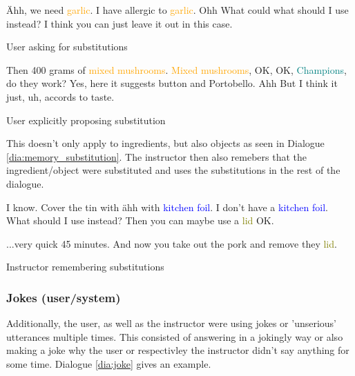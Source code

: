 \documentclass[
	11pt, %
]{fphw}
\newenvironment{captionedDialogue}
    {\captionsetup{
        type=Dialogue,
        skip=2pt,
        belowskip=15pt
        }
    }
    {}
\newenvironment{mydialogue}
    {\begin{snugshade}
     \hrulefill
     \begin{dialogue}}
    {\end{dialogue}
     \hrulefill
     \end{snugshade}}
\begin{document}
\begin{captionedDialogue}
    \begin{mydialogue}
         Ähh, we need \textcolor{orange}{garlic}. 
         I have allergic to \textcolor{orange}{garlic}.
         Ohh 
         What could what should I use instead? 
         I think you can just leave it out in this case.
    \end{mydialogue}
    \caption{User asking for substitutions}
    \label{dia:impl_substitution}
\end{captionedDialogue}

\begin{captionedDialogue}
    \begin{mydialogue}
         Then 400 grams of \textcolor{orange}{mixed mushrooms}. 
         \textcolor{orange}{Mixed mushrooms}, OK, OK, \textcolor{teal}{Champions}, do they work? 
         Yes, here it suggests button and Portobello. 
         Ahh 
         But I think it just, uh, accords to taste.
    \end{mydialogue}
    \caption{User explicitly proposing substitution}
    \label{dia:expl_substitution}
\end{captionedDialogue}

This doesn't only apply to ingredients, but also objects as seen in Dialogue \ref{dia:memory_substitution}. The instructor then also remebers that the ingredient/object were substituted and uses the substitutions in the rest of the dialogue.

\begin{captionedDialogue}
    \begin{mydialogue}
         I know. Cover the tin with ähh with \textcolor{blue}{kitchen foil}. 
         I don't have a \textcolor{blue}{kitchen foil}. What should I use instead? 
         Then you can maybe use a \textcolor{olive}{lid}
         OK.
        
        \medskip
        \direct{\dots}
        \medskip

         ...very quick 45 minutes. And now you take out the pork and remove they \textcolor{olive}{lid}. 
    \end{mydialogue}
    \caption{Instructor remembering substitutions}
    \label{dia:memory_substitution}
\end{captionedDialogue}

\subsubsection*{Jokes (user/system)}
Additionally, the user, as well as the instructor were using jokes or 'unserious' utterances multiple times. This consisted of answering in a jokingly way or also making a joke why the user or respectivley the instructor didn't say anything for some time. Dialogue \ref{dia:joke} gives an example.
\end{document}
